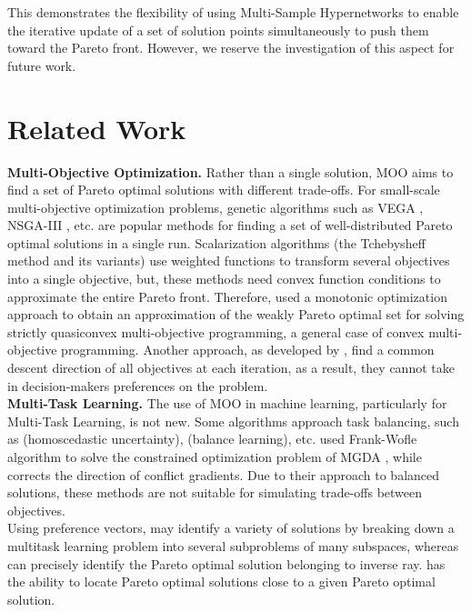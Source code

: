 \documentclass[letterpaper]{article} %
\begin{document}
This demonstrates the flexibility of using Multi-Sample Hypernetworks to enable the iterative update of a set of solution points simultaneously to push them toward the Pareto front. However, we reserve the investigation of this aspect for future work.

\section{Related Work}
\label{st:4}
\indent \textbf{Multi-Objective Optimization.} Rather than a single solution, MOO aims to find a set of Pareto optimal solutions with different trade-offs. For small-scale multi-objective optimization problems, genetic algorithms such as VEGA \cite{inproceedings}, NSGA-III \cite{6600851}, etc. are popular methods for finding a set of well-distributed Pareto optimal solutions in a single run. Scalarization algorithms (the Tchebysheff method \cite{article} and its variants) use weighted functions to transform several objectives into a single objective, but, these methods need convex function conditions to approximate the entire Pareto front. Therefore, \cite{thang2020monotonic} used a monotonic optimization approach to obtain an approximation of the weakly Pareto optimal set for solving strictly quasiconvex multi-objective programming, a general case of convex multi-objective programming. Another approach, as developed by \cite{gradientbased1}, \cite{gradientbased3} find a common descent direction of all objectives at each iteration, as a result, they cannot take in decision-makers preferences on the problem.\\
\indent \textbf{Multi-Task Learning.} The use of MOO in machine learning, particularly for Multi-Task Learning, is not new.  Some algorithms approach task balancing, such as \cite{kendall2018multitask} (homoscedastic uncertainty), \cite{chen2018gradnorm} (balance learning), etc. \cite{sener2019multitask} used Frank-Wofle algorithm to solve the constrained optimization problem of MGDA \cite{gradientbased3}, while \cite{yu2020gradient} corrects the direction of conflict gradients. Due to their approach to balanced solutions, these methods are not suitable for simulating trade-offs between objectives. \\
Using preference vectors, \cite{lin2019pareto} may identify a variety of solutions by breaking down a multitask learning problem into several subproblems of many subspaces, whereas \cite{pmlr-v119-mahapatra20a} can precisely identify the Pareto optimal solution belonging to inverse ray.  \cite{ma2020efficient} has the ability to locate Pareto optimal solutions close to a given Pareto optimal solution.
\end{document}
